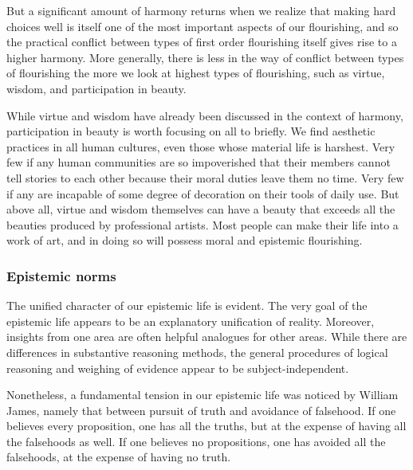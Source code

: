 But a significant amount of harmony returns when we realize that making hard choices well is itself one of the most 
important aspects of our flourishing, and so the practical conflict between types of first order flourishing itself gives rise
to a higher harmony. More generally, there is less in the way of conflict between types of flourishing the more we look 
at highest types of flourishing, such as virtue, wisdom, and participation in beauty. 

While virtue and wisdom have already been discussed in the context of harmony, participation in beauty is worth focusing
on all to briefly. We find aesthetic practices in all human cultures, even those whose material life is harshest. Very 
few if any human communities are so impoverished that their members cannot tell stories to each other because their moral
duties leave them no time. Very few if any are incapable of some degree of decoration on their tools of daily use. But
above all, virtue and wisdom themselves can have a beauty that exceeds all the beauties produced by professional artists.
Most people can make their life into a work of art, and in doing so will possess moral and epistemic flourishing.

\subsubsection{Epistemic norms}
The unified character of our epistemic life is evident. The very goal of the epistemic life appears to be an explanatory unification of reality. Moreover, insights from one area are often helpful analogues for other areas. While there are differences in 
substantive reasoning methods, the general procedures of logical reasoning and weighing of evidence appear to be 
subject-independent.

Nonetheless, a fundamental tension in our epistemic life was noticed by William James, namely that between pursuit of truth and 
avoidance of falsehood. If one believes every proposition, one has all the truths, but at the expense of having 
all the falsehoods as well. If one believes no propositions, one has avoided all the falsehoods, at the expense of 
having no truth. 

